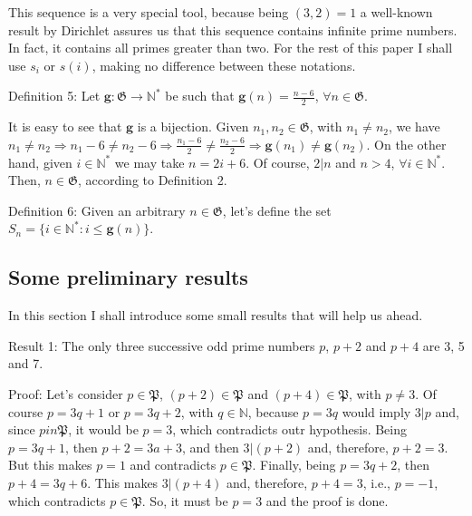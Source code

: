 \documentclass[a4paper,12pt]{article}
\begin{document}
This sequence is a very special tool, because being $(3,2) = 1$ a well-known result by Dirichlet assures us that this sequence contains infinite prime numbers. In fact, it contains all primes greater than two. For the rest of this paper I shall use $s_i$ or $s(i)$, making no difference between these notations. \newline

Definition 5: Let $\mathbf{g}: \mathfrak{G} \rightarrow \mathbb{N}^*$ be such that $\mathbf{g}(n) = \frac{n-6}{2}$, $\forall n \in \mathfrak{G}$. \newline

It is easy to see that $\mathbf{g}$ is a bijection. Given $n_1, n_2 \in \mathfrak{G}$, with $n_1 \neq n_2$, we
have $n_1 \neq n_2 \Rightarrow n_1 - 6 \neq n_2 - 6 \Rightarrow \frac{n_1 - 6}{2} \neq \frac{n_2 - 6}{2} \Rightarrow \mathbf{g}(n_1) \neq \mathbf{g}(n_2)$. On the other hand, given $i \in \mathbb{N}^*$ we may take $n = 2i + 6$. Of course, $2|n$ and $n > 4$, $\forall i \in \mathbb{N}^*$. Then, $n \in \mathfrak{G}$, according to Definition 2. \newline

Definition 6: Given an arbitrary $n \in \mathfrak{G}$, let's define the set $S_n = \{ i \in \mathbb{N}^*: i \le \mathbf{g}(n) \}$.

\subsection{Some preliminary results}

In this section I shall introduce some small results that will help us ahead. \newline

Result 1: The only three successive odd prime numbers $p$, $p + 2$ and $p + 4$ are 3, 5 and 7. \newline

Proof: Let's consider $p \in \mathfrak{P}$, $(p + 2) \in \mathfrak{P}$ and $(p + 4) \in \mathfrak{P}$, with $p \neq 3$. Of course $p = 3q + 1$ or $p = 3q + 2$, with $q \in \mathbb{N}$, because $p = 3q$ would imply $3 | p$ and, since $p in \mathfrak{P}$, it would be $p = 3$, which contradicts outr hypothesis. Being $p = 3q + 1$, then $p + 2 = 3a + 3$, and then $3 | (p + 2)$ and, therefore, $p + 2 = 3$. But this makes $p = 1$ and contradicts $p \in \mathfrak{P}$. Finally, being $p = 3q + 2$, then $p + 4 = 3q + 6$. This makes $3 | (p + 4)$ and, therefore, $p + 4 = 3$, i.e., $p = -1$, which contradicts $p \in \mathfrak{P}$. So, it must be $p = 3$ and the proof is done. \newline   
\end{document}
